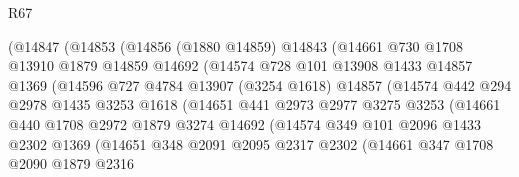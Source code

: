 \begin{lexlean}{R67}
\begin{coremodule}
                    (@14847
                      (@14853
                        (@14856
                          (@1880 @14859)
                          @14843
                          (@14661
                            @730
                            @1708
                            @13910
                            @1879
                            @14859
                            @14692
                            (@14574
                              @728
                              @101
                              @13908
                              @1433
                              @14857
                              @1369
                              (@14596
                                @727
                                @4784
                                @13907
                                (@3254 @1618)
                                @14857
                                (@14574
                                  @442
                                  @294
                                  @2978
                                  @1435
                                  @3253
                                  @1618
                                  (@14651
                                    @441
                                    @2973
                                    @2977
                                    @3275
                                    @3253
                                    (@14661
                                      @440
                                      @1708
                                      @2972
                                      @1879
                                      @3274
                                      @14692
                                      (@14574
                                        @349
                                        @101
                                        @2096
                                        @1433
                                        @2302
                                        @1369
                                        (@14651
                                          @348
                                          @2091
                                          @2095
                                          @2317
                                          @2302
                                          (@14661
                                            @347
                                            @1708
                                            @2090
                                            @1879
                                            @2316

\end{coremodule}
\end{lexlean}
